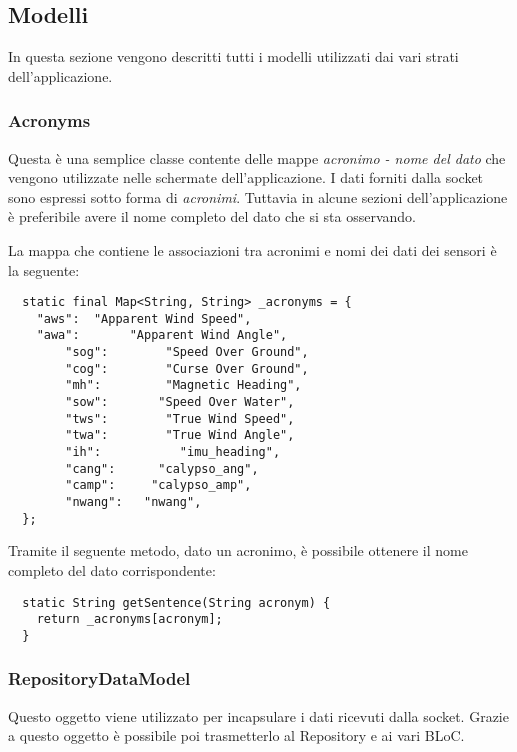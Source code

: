 \subsection{Modelli}
In questa sezione vengono descritti tutti i modelli utilizzati dai vari strati dell'applicazione.

\subsubsection{Acronyms}
Questa è una semplice classe contente delle mappe \textit{acronimo - nome del dato} che vengono utilizzate nelle schermate dell'applicazione. I dati forniti dalla socket sono espressi sotto forma di \textit{acronimi}. Tuttavia in alcune sezioni dell'applicazione è preferibile avere il nome completo del dato che si sta osservando.

La mappa che contiene le associazioni tra acronimi e nomi dei dati dei sensori è la seguente:

  \begin{lstlisting}
  static final Map<String, String> _acronyms = {
   	"aws":	"Apparent Wind Speed",
	"awa":       "Apparent Wind Angle",
    	"sog":        "Speed Over Ground",
    	"cog":        "Curse Over Ground",
    	"mh":         "Magnetic Heading",
    	"sow":       "Speed Over Water",
    	"tws":        "True Wind Speed",
    	"twa":        "True Wind Angle",
    	"ih":           "imu_heading",
    	"cang":      "calypso_ang",
    	"camp":     "calypso_amp",
    	"nwang":   "nwang",
  };
  \end{lstlisting}

Tramite il seguente metodo, dato un acronimo, è possibile ottenere il nome completo del dato corrispondente:
\begin{lstlisting}
  static String getSentence(String acronym) {
  	return _acronyms[acronym];
  }
  \end{lstlisting}

\subsubsection{RepositoryDataModel}
Questo oggetto viene utilizzato per incapsulare i dati ricevuti dalla socket. Grazie a questo oggetto è possibile poi trasmetterlo al Repository e ai vari BLoC.

